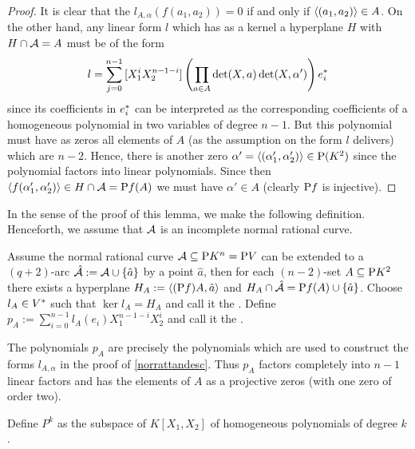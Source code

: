 \begin{proof}
    It is clear that the $l_{A,\alpha}(f(a_1,a_2))=0$ if and only if $\gen{(a_1,a_2)}\in A$. On the other hand, any linear form $l$ which has as a kernel a hyperplane $H$ with $H\cap\mathcal{A}=A$ must be of the form
    $$
    l=\sum_{j=0}^{n-1}{[X_1^i X_2^{n-1-i}]\left(\prod_{a\in A}{\det(X,a)}\det(X,\alpha')\right){e}^{\ast}_i}
    $$
    since its coefficients in ${e}^{\ast}_i$ can be interpreted as the corresponding coefficients of a homogeneous polynomial in two variables of degree $n-1$. But this polynomial must have as zeros all elements of $A$ (as the assumption on the form $l$ delivers) which are $n-2$. Hence, there is another zero $\alpha'=\gen{(\alpha'_1,\alpha'_2)}\in\P(K^2)$ since the polynomial factors into linear polynomials. Since then $\gen{f(\alpha'_1,\alpha'_2)}\in H\setmeet\cA=\proj f(A)$ we must have $\alpha'\in A$ (clearly $\mathrm{P} f$ is injective).    
\end{proof}
In the sense of the proof of this lemma, we make the following definition.
Henceforth, we assume that $\mathcal{A}$ is an incomplete normal rational curve.

\begin{definition}
    Assume the normal rational curve $\mathcal{A}\subseteq \mathrm{P}{K^n}=\mathrm{P}{V}$ can be extended to a $(q+2)$-arc $\hat{\cA}:=\cA\setjoin\set{\hat{a}}$ by a point $\hat a$, then for each $(n-2)$-set $A\subseteq\mathrm{P}{K^2}$ there exists a hyperplane $H_A:=\gen{(\proj f)A,\hat{a}}$ and $H_A\setmeet \hat{\cA}=\proj f(A)\setjoin\set{\hat{a}}$. Choose $l_A\in{V}^{\ast}$ such that $\ker{l_A}=H_A$ and call it the .
    Define $p_A:=\sum_{i=0}^{n-1}{l_A(e_i)X_1^{n-1-i}X_2^i}$ and call it the .
\end{definition}

\begin{remark}
    The polynomials $p_A$ are precisely the polynomials which are used to construct the forms $l_{A,\alpha}$ in the proof of \autoref{norrattandesc}. Thus $p_A$ factors completely into $n-1$ linear factors and has the elements of $A$ as a projective zeros (with one zero of order two).
\end{remark}

\begin{definition}
    Define $P^k$ as the subspace of $K[X_1,X_2]$ of homogeneous polynomials of degree $k$.
\end{definition}


